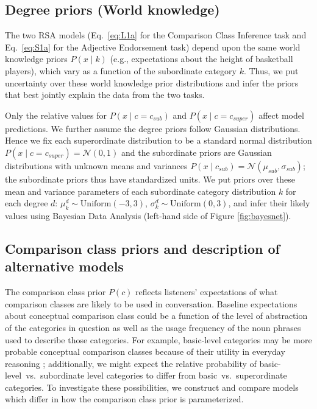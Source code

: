 \documentclass[doc]{apa6}
\begin{document}
\subsection{Degree priors (World knowledge)}

The two RSA models (Eq.~\ref{eq:L1a} for the Comparison Class Inference task and Eq.~\ref{eq:S1a} for the Adjective Endorsement task) depend upon the same world knowledge priors $P(x \mid k)$ (e.g., expectations about the height of basketball players), which vary as a function of the subordinate category $k$. 
Thus, we put uncertainty over these world knowledge prior distributions and infer the priors that best jointly explain the data from the two tasks. 

Only the relative values for \(P(x \mid c = c_{sub})\) and \(P(x \mid c = c_{super})\) affect model predictions. 
We further assume the degree priors follow Gaussian distributions.
Hence we fix each superordinate distribution to be a standard normal distribution \(P(x \mid c = c_{super}) = \mathcal{N}(0, 1)\) and the subordinate priors are Gaussian distributions with unknown means and variances \(P(x \mid c_{sub}) = \mathcal{N}(\mu_{sub}, \sigma_{sub})\); the subordinate priors thus have standardized units.
We put priors over these mean and variance parameters of each subordinate category distribution $k$ for each degree $d$: $\mu^d_k \sim \text{Uniform}(-3, 3)$, $\sigma^d_k \sim \text{Uniform}(0, 3)$, and infer their likely values using Bayesian Data Analysis (left-hand side of Figure \ref{fig:bayesnet}). 

\subsection{Comparison class priors and description of alternative models}

The comparison class prior $P(c)$ reflects listeners' expectations of what comparison classes are likely to be used in conversation. 
Baseline expectations about conceptual comparison class could be a function of the level of abstraction of the categories in question as well as the usage frequency of the noun phrases used to describe those categories. 
For example, basic-level categories may be more probable conceptual comparison classes because of their utility in everyday reasoning \cite{rosch1975family}; additionally, we might expect the relative probability of basic-level~vs.~subordinate level categories to differ from basic~vs.~superordinate categories.
To investigate these possibilities, we construct and compare models which differ in how the comparison class prior is parameterized.
\end{document}
